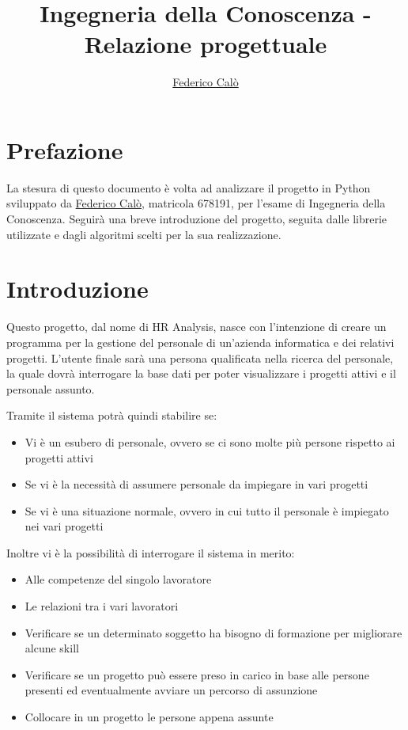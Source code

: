 \documentclass[a4paper]{extarticle}
\title{Ingegneria della Conoscenza - Relazione progettuale}
\author{\href{http://www.federicocalo.dev}{Federico Calò} }
\date{}
\begin{document}
\maketitle
\newpage
\tableofcontents
\voffset -30pt

\newpage

\section{Prefazione}

La stesura di questo documento è volta ad analizzare il progetto in Python sviluppato da \href{http://www.federicocalo.dev}{Federico Calò}, matricola 678191, per l'esame di Ingegneria della Conoscenza. Seguirà una breve introduzione del progetto, seguita dalle librerie utilizzate e dagli algoritmi scelti per la sua realizzazione.

\newpage

\section{Introduzione}

Questo progetto, dal nome di HR Analysis, nasce con l'intenzione di creare un programma per la gestione del personale di un'azienda informatica e 
dei relativi progetti. L'utente finale sarà una persona qualificata nella ricerca del personale, la quale dovrà interrogare 
la base dati per poter visualizzare i progetti attivi e il personale assunto. 

Tramite il sistema potrà quindi stabilire se:
\begin{itemize}
	\item Vi è un esubero di personale, ovvero se ci sono molte più persone rispetto ai progetti attivi
	\item Se vi è la necessità di assumere personale da impiegare in vari progetti
	\item Se vi è una situazione normale, ovvero in cui tutto il personale è impiegato nei vari progetti
\end{itemize}

Inoltre vi è la possibilità di interrogare il sistema in merito:
\begin{itemize}
	\item Alle competenze del singolo lavoratore
	\item Le relazioni tra i vari lavoratori
	\item Verificare se un determinato soggetto ha bisogno di formazione per migliorare alcune skill
	\item Verificare se un progetto può essere preso in carico in base alle persone presenti ed eventualmente avviare un percorso 
		  di assunzione
	\item Collocare in un progetto le persone appena assunte
\end{itemize}
\end{document}
